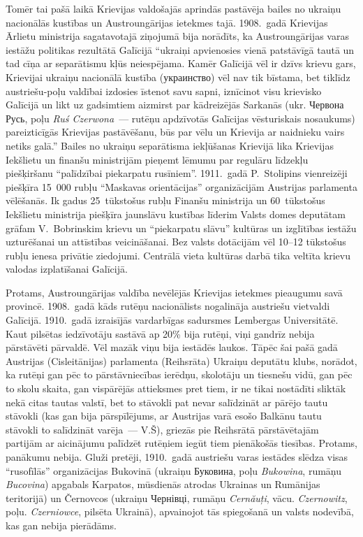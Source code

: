 \documentclass[twoside,a5paper,12pt,fleqn,openany]{extbook}
\newcommand{\pltxti}[1]{\textit{\textpolish{#1}}}
\newcommand{\rutxti}[1]{\textrussian{#1}}
\newcommand{\detxti}[1]{\textit{\textgerman{#1}}}
\newcommand{\uktxti}[1]{\textukrainian{#1}}
\newcommand{\rotxti}[1]{\textit{\textromanian{#1}}}
\begin{document}
Tomēr tai pašā laikā Krievijas valdošajās aprindās pastāvēja bailes no ukraiņu nacionālās kustības un Austroungārijas ietekmes tajā. 1908.~gadā Krievijas Ārlietu ministrija sagatavotajā ziņojumā bija norādīts, ka Austroungārijas varas iestāžu politikas rezultātā Galīcijā ``ukraiņi apvienosies vienā patstāvīgā tautā un tad cīņa ar separātismu kļūs neiespējama. Kamēr Galīcijā vēl ir dzīvs krievu gars, Krievijai ukraiņu nacionālā kustība (\rutxti{украинство}) vēl nav tik bīstama, bet tiklīdz austriešu-poļu valdībai izdosies īstenot savu sapni, iznīcinot visu krievisko Galīcijā un likt uz gadsimtiem aizmirst par kādreizējās Sarkanās (ukr. \uktxti{Червона Русь}, poļu \pltxti{Ruś Czerwona}~--- rutēņu apdzīvotās Galīcijas vēsturiskais nosaukums) pareizticīgās Krievijas pastāvēšanu, būs par vēlu un Krievija ar naidnieku vairs netiks galā.'' Bailes no ukraiņu separātisma iekļūšanas Krievijā lika Krievijas Iekšlietu un finanšu ministrijām pieņemt lēmumu par regulāru līdzekļu piešķiršanu ``palīdzībai piekarpatu rusīniem''. 1911.~gadā P.~Stolipins vienreizēji piešķīra 15~000 rubļu ``Maskavas orientācijas'' organizācijām Austrijas parlamenta vēlēšanās. Ik gadus 25~tūkstošus rubļu Finanšu ministrija un 60~tūkstošus Iekšlietu ministrija piešķīra jaunslāvu kustības līderim Valsts domes deputātam grāfam V.~Bobrinskim krievu un ``piekarpatu slāvu'' kultūras un izglītības iestāžu uzturēšanai un attīstības veicināšanai. Bez valsts dotācijām vēl 10--12 tūkstošus rubļu ienesa privātie ziedojumi. Centrālā vieta kultūras darbā tika veltīta krievu valodas izplatīšanai Galīcijā.

Protams, Austroungārijas valdība nevēlējās Krievijas ietekmes pieaugumu savā provincē. 1908.~gadā kāds rutēņu nacionālists nogalināja austriešu vietvaldi Galīcijā. 1910.~gadā izraisījās vardarbīgas sadursmes Lembergas Universitātē. Kaut pilsētas iedzīvotāju sastāvā ap 20\% bija rutēņi, viņi gandrīz nebija pārstāvēti pārvaldē. Vēl mazāk viņu bija iestādēs laukos. Tāpēc šai pašā gadā Austrijas (Cisleitānijas) parlamenta (Reihsrāta) Ukraiņu deputātu klubs, norādot, ka rutēņi gan pēc to pārstāvniecības ierēdņu, skolotāju un tiesnešu vidū, gan pēc to skolu skaita, gan vispārējās attieksmes pret tiem, ir ne tikai nostādīti sliktāk nekā citas tautas valstī, bet to stāvokli pat nevar salīdzināt ar pārējo tautu stāvokli (kas gan bija pārspīlējums, ar Austrijas varā esošo Balkānu tautu stāvokli to salīdzināt varēja~--- V.Š), griezās pie Reihsrātā pārstāvētajām partijām ar aicinājumu palīdzēt rutēņiem iegūt tiem pienākošās tiesības. Protams, panākumu nebija. Gluži pretēji, 1910.~gadā austriešu varas iestādes slēdza visas ``rusofīlās'' organizācijas Bukovinā (ukraiņu \uktxti{Буковина}, poļu \pltxti{Bukowina}, rumāņu \rotxti{Bucovina}) apgabals Karpatos, mūsdienās atrodas Ukrainas un Rumānijas teritorijā) un Černovcos (ukraiņu \uktxti{Чернівці}, rumāņu \rotxti{Cernăuţi}, vācu. \detxti{Czernowitz}, poļu. \pltxti{Czerniowce}, pilsēta Ukrainā), apvainojot tās spiegošanā un valsts nodevībā, kas gan nebija pierādāms.
\end{document}
